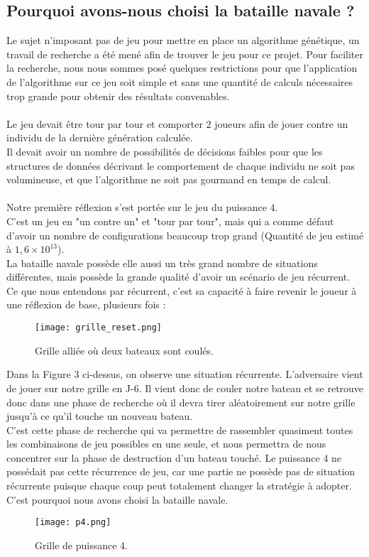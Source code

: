 \documentclass[12pt]{report}
\begin{document}
	\subsection{Pourquoi avons-nous choisi la bataille navale ?}
	Le sujet n'imposant pas de jeu pour mettre en place un algorithme génétique, un travail de recherche a été mené afin de trouver le jeu pour ce projet. Pour faciliter la recherche, nous nous sommes posé quelques restrictions pour que l'application de l'algorithme sur ce jeu soit simple et sans une quantité de calculs nécessaires trop grande pour obtenir des résultats convenables.\\\\
	Le jeu devait être tour par tour et comporter 2 joueurs afin de jouer contre un individu de la dernière génération calculée.\\
	Il devait avoir un nombre de possibilités de décisions faibles pour que les structures de données décrivant le comportement de chaque individu ne soit pas volumineuse, et que l'algorithme ne soit pas gourmand en temps de calcul.\\\\
	Notre première réflexion s'est portée sur le jeu du puissance 4.\\
	C'est un jeu en "un contre un" et "tour par tour", mais qui a comme défaut d'avoir un nombre de configurations beaucoup trop grand (Quantité de jeu estimé à $1,6 \times 10^{13}$).\\
	La bataille navale possède elle aussi un très grand nombre de situations différentes, mais possède la grande qualité d'avoir un scénario de jeu récurrent.\\
	Ce que nous entendons par récurrent, c'est sa capacité à faire revenir le joueur à une réflexion de base, plusieurs fois :\\
	\begin{figure}[h]
    	\begin{center}
		\texttt{[image: grille\_reset.png]}
		\caption{Grille alliée où deux bateaux sont coulés.}
		\end{center}
	\end{figure}
	\newpage
	Dans la Figure 3 ci-dessus, on observe une situation récurrente. L'adversaire vient de jouer sur notre grille en J-6. Il vient donc de couler notre bateau et se retrouve donc dans une phase de recherche où il devra tirer aléatoirement sur notre grille jusqu'à ce qu'il touche un nouveau bateau.\\
	C'est cette phase de recherche qui va permettre de rassembler quasiment toutes les combinaisons de jeu possibles en une seule, et nous permettra de nous concentrer sur la phase de destruction d'un bateau touché. Le puissance 4 ne possédait pas cette récurrence de jeu, car une partie ne possède pas de situation récurrente puisque chaque coup peut totalement changer la stratégie à adopter. C'est pourquoi nous avons choisi la bataille navale.\\
	\begin{figure}[h]
    	\begin{center}
		\texttt{[image: p4.png]}
		\caption{Grille de puissance 4.}
		\end{center}
	\end{figure}
	
\end{document}
